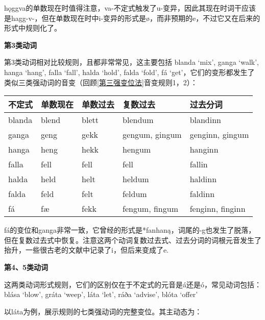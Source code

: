 hǫggva的单数现在时值得注意，va-不定式触发了u-变异，因此其现在时词干应该是hagg-v-，但在单数现在时中i-变异的形式是ø，而非预期的e，不过它又在后来的形式中规则化了。

\textbf{第3类动词}

第3类动词相对比较规则，且都非常常见，这主要包括 blanda `mix', ganga
`walk', hanga `hang', falla `fall', halda `hold', falda `fold', fá
`get'，它们的变形都发生了类似三类强动词的音变（回顾\ref{第三强变位法}音变规则1，2）：

\begin{longtable}{lllll}
  \toprule
  不定式    & 单数现在  & 单数过去  & 复数过去           & 过去分词             \\
  \midrule
  \endhead
  \bottomrule
  \endfoot
  blanda & blend & blett & blendum        & blandinn         \\
  ganga  & geng  & gekk  & gengum, gingum & genginn, gingum  \\
  hanga  & heng  & hekk  & hengum         & hanginn          \\
  falla  & fell  & fell  & fell           & fallin           \\
  halda  & held  & helt  & heldum         & haldinn          \\
  falda  & feld  & felt  & feldum         & faldinn          \\
  fá     & fæ    & fekk  & fengum, fingum & fenginn, finginn \\
\end{longtable}

fá的变位和ganga非常一致，它曾经的形式是*fanhaną，词尾的-g也发生了脱落，但在复数过去式中恢复。注意这两个动词复数过去式、过去分词的词根元音发生了抬升，一些很古老的文献中记录了i，但后来变成了e.

\textbf{第4、5类动词}

这两类动词形式规则，它们的区别仅在于不定式的元音是á还是ó，常见动词包括：blása
`blow', gráta `weep', láta `let', ráða `advise', blóta `offer‌'

以láta为例，展示规则的七类强动词的完整变位。其主动态为：

